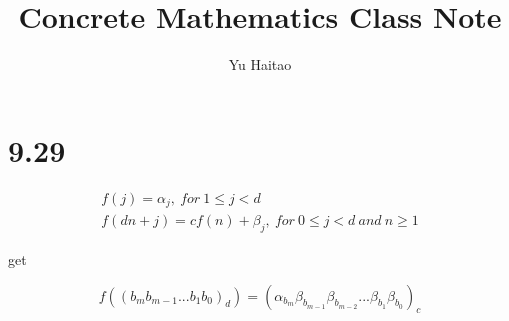 \documentclass{article}
\title{Concrete Mathematics Class Note}
\author{Yu Haitao}
\begin{document}
\maketitle

\section{9.29}

\begin{gather}
f(j)=\alpha_{j},\ for\ 1 \leqslant j < d \\
f(dn+j)=cf(n)+\beta_j,\ for\ 0 \leqslant j<d\ and\ n \geqslant 1
\end{gather}

get

\begin{equation}
f((b_mb_{m-1}...b_1b_0)_d)=(\alpha_{b_{m}}\beta_{b_{m-1}}\beta_{b_{m-2}}...\beta_{b_1}\beta_{b_0})_c
\end{equation}
\end{document}
